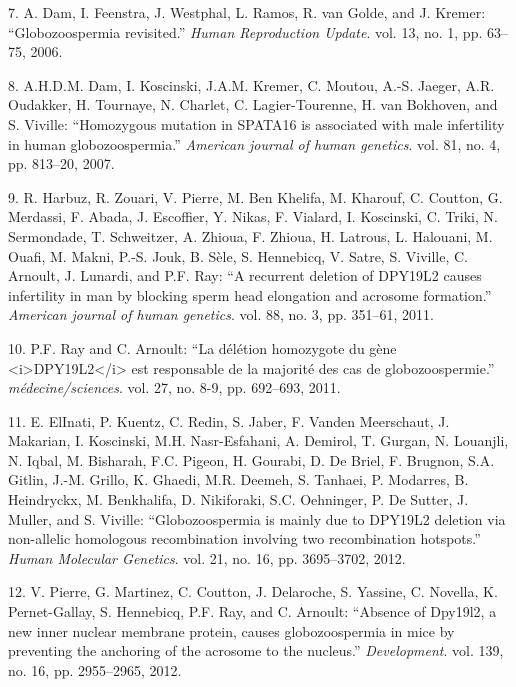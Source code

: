 \documentclass[12pt,twoside]{ugathesis}
\begin{document}
\hypertarget{ref-Dam2006}{}
7. A. Dam, I. Feenstra, J. Westphal, L. Ramos, R. van Golde, and J.
Kremer: ``Globozoospermia revisited.'' \emph{Human Reproduction Update}.
vol. 13, no. 1, pp. 63--75, 2006.

\hypertarget{ref-Dam2007}{}
8. A.H.D.M. Dam, I. Koscinski, J.A.M. Kremer, C. Moutou, A.-S. Jaeger,
A.R. Oudakker, H. Tournaye, N. Charlet, C. Lagier-Tourenne, H. van
Bokhoven, and S. Viville: ``Homozygous mutation in SPATA16 is associated
with male infertility in human globozoospermia.'' \emph{American journal
of human genetics}. vol. 81, no. 4, pp. 813--20, 2007.

\hypertarget{ref-Harbuz2011}{}
9. R. Harbuz, R. Zouari, V. Pierre, M. Ben Khelifa, M. Kharouf, C.
Coutton, G. Merdassi, F. Abada, J. Escoffier, Y. Nikas, F. Vialard, I.
Koscinski, C. Triki, N. Sermondade, T. Schweitzer, A. Zhioua, F. Zhioua,
H. Latrous, L. Halouani, M. Ouafi, M. Makni, P.-S. Jouk, B. Sèle, S.
Hennebicq, V. Satre, S. Viville, C. Arnoult, J. Lunardi, and P.F. Ray:
``A recurrent deletion of DPY19L2 causes infertility in man by blocking
sperm head elongation and acrosome formation.'' \emph{American journal
of human genetics}. vol. 88, no. 3, pp. 351--61, 2011.

\hypertarget{ref-Ray2011}{}
10. P.F. Ray and C. Arnoult: ``La délétion homozygote du gène
\textless{}i\textgreater{}DPY19L2\textless{}/i\textgreater{} est
responsable de la majorité des cas de globozoospermie.''
\emph{médecine/sciences}. vol. 27, no. 8-9, pp. 692--693, 2011.

\hypertarget{ref-ElInati2012}{}
11. E. ElInati, P. Kuentz, C. Redin, S. Jaber, F. Vanden Meerschaut, J.
Makarian, I. Koscinski, M.H. Nasr-Esfahani, A. Demirol, T. Gurgan, N.
Louanjli, N. Iqbal, M. Bisharah, F.C. Pigeon, H. Gourabi, D. De Briel,
F. Brugnon, S.A. Gitlin, J.-M. Grillo, K. Ghaedi, M.R. Deemeh, S.
Tanhaei, P. Modarres, B. Heindryckx, M. Benkhalifa, D. Nikiforaki, S.C.
Oehninger, P. De Sutter, J. Muller, and S. Viville: ``Globozoospermia is
mainly due to DPY19L2 deletion via non-allelic homologous recombination
involving two recombination hotspots.'' \emph{Human Molecular Genetics}.
vol. 21, no. 16, pp. 3695--3702, 2012.

\hypertarget{ref-Pierre2012}{}
12. V. Pierre, G. Martinez, C. Coutton, J. Delaroche, S. Yassine, C.
Novella, K. Pernet-Gallay, S. Hennebicq, P.F. Ray, and C. Arnoult:
``Absence of Dpy19l2, a new inner nuclear membrane protein, causes
globozoospermia in mice by preventing the anchoring of the acrosome to
the nucleus.'' \emph{Development}. vol. 139, no. 16, pp. 2955--2965,
2012.
\end{document}
